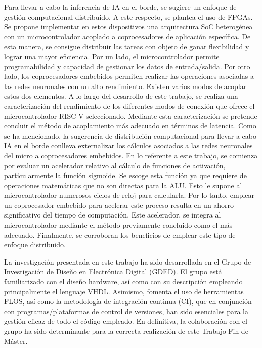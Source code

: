 Para llevar a cabo la inferencia de IA en el borde, se sugiere un enfoque de gestión computacional distribuido.
A este respecto, se plantea el uso de FPGAs.
Se propone implementar en estos dispositivos una arquitectura SoC heterogénea con un microcontrolador acoplado a coprocesadores de aplicación específica.
De esta manera, se consigue distribuir las tareas con objeto de ganar flexibilidad y lograr una mayor eficiencia.
Por un lado, el microcontrolador permite programabilidad y capacidad de gestionar los datos de entrada/salida. 
Por otro lado, los coprocesadores embebidos permiten realizar las operaciones asociadas a las redes neuronales con un alto rendimiento. 
Existen varios modos de acoplar estos dos elementos.
A lo largo del desarrollo de este trabajo, se realiza una caracterización del rendimiento de los diferentes modos de conexión que ofrece el microcontrolador RISC-V seleccionado.
Mediante esta caracterización se pretende concluir el método de acoplamiento más adecuado en términos de latencia.
Como se ha mencionado, la sugerencia de distribución computacional para llevar a cabo IA en el borde conlleva externalizar los cálculos asociados a las redes neuronales del micro a coprocesadores embebidos.
En lo referente a este trabajo, se comienza por evaluar un acelerador relativo al cálculo de funciones de activación, particularmente la función sigmoide.
Se escoge esta función ya que requiere de operaciones matemáticas que no son directas para la ALU.
Esto le supone al microcontrolador numerosos ciclos de reloj para calcularla. 
Por lo tanto, emplear un coprocesador embebido para acelerar este proceso resulta en un ahorro significativo del tiempo de computación.
Este acelerador, se integra al microcontrolador mediante el método previamente concluido como el más adecuado. 
Finalmente, se corroboran los beneficios de emplear este tipo de enfoque distribuido.

La investigación presentada en este trabajo ha sido desarrollada en el Grupo de Investigación de Diseño en Electrónica Digital (GDED).
El grupo está familiarizado con el diseño hardware, así como con su descripción empleando principalmente el lenguaje VHDL. 
Asimismo, fomenta el uso de herramientas FLOS, así como la metodología de integración continua (CI), que en conjunción con programas/plataformas de control de versiones, han sido esenciales para la gestión eficaz de todo el código empleado.
En definitiva, la colaboración con el grupo ha sido determinante para la correcta realización de este Trabajo Fin de Máster.

